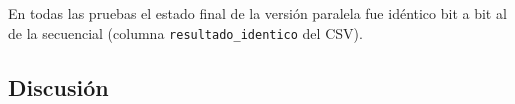 \documentclass[11pt,letterpaper]{article}
\newcommand{\codigo}[1]{\texttt{#1}}
\begin{document}
\begin{table}[H]
  \centering
  \caption{Tiempo por etapa (ms por frame): secuencial y OpenMP con 8 hilos.}
  \label{tab:etapas}
  \small
  
\end{table}

\begin{table}[H]
  \centering
  \caption{FPS del screensaver real (incluye dibujar) con 8 hilos. En el
  screensaver, la zona 0\% usa el mismo recorrido completo que OpenMP pero con
  un solo hilo, por eso sus ms de simulación son mayores que los de la versión
  secuencial del benchmark.}
  \label{tab:fps}
  \small
  
\end{table}

En todas las pruebas el estado final de la versión paralela fue idéntico bit a
bit al de la secuencial (columna \codigo{resultado\_identico} del CSV).

\subsection{Discusión}\label{sec:discusion}
\end{document}
